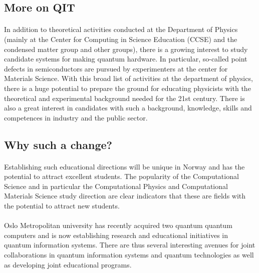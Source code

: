 \documentclass[%
oneside,                 %
final,                   %
10pt]{article}
\begin{document}
\subsection*{More on QIT}


\paragraph{}
In addition to theoretical activities conducted at the Department of
Physics (mainly at the Center for Computing in Science Education
(CCSE) and the condensed matter group and other groups), there is a
growing interest to study candidate systems for making quantum
hardware. In particular, so-called point defects in semiconductors are
pursued by experimenters at the center for Materials Science.  With
this broad list of activities at the department of physics, there is a
huge potential to prepare the ground for educating physicists with the
theoretical and experimental background needed for the 21st
century. There is also a great interest in candidates with such a
background, knowledge, skills and competences in industry and the
public sector.



\subsection*{Why such a change?}


\paragraph{}
Establishing such educational directions will be unique in Norway and
has the potential to attract excellent students.  The popularity of
the Computational Science and in particular the Computational Physics
and Computational Materials Science study direction are clear
indicators that these are fields with the potential to attract new
students.




\paragraph{}
Oslo Metropolitan university has recently acquired two quantum
quantum computers and is now establishing research and educational
initiatives in quantum information systems. There are thus several
interesting avenues for joint collaborations in quantum information
systems and quantum technologies as well as developing joint
educational programs.
\end{document}
